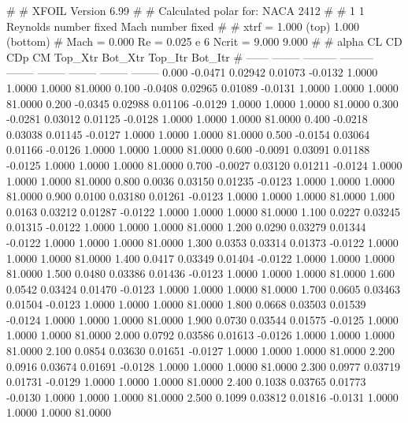 #  
#       XFOIL         Version 6.99
#  
# Calculated polar for: NACA 2412                                       
#  
# 1 1 Reynolds number fixed          Mach number fixed         
#  
# xtrf =   1.000 (top)        1.000 (bottom)  
# Mach =   0.000     Re =     0.025 e 6     Ncrit =   9.000  9.000
#  
#   alpha    CL        CD       CDp       CM     Top_Xtr  Bot_Xtr  Top_Itr  Bot_Itr
#  ------ -------- --------- --------- -------- -------- -------- -------- --------
   0.000  -0.0471   0.02942   0.01073  -0.0132   1.0000   1.0000   1.0000  81.0000
   0.100  -0.0408   0.02965   0.01089  -0.0131   1.0000   1.0000   1.0000  81.0000
   0.200  -0.0345   0.02988   0.01106  -0.0129   1.0000   1.0000   1.0000  81.0000
   0.300  -0.0281   0.03012   0.01125  -0.0128   1.0000   1.0000   1.0000  81.0000
   0.400  -0.0218   0.03038   0.01145  -0.0127   1.0000   1.0000   1.0000  81.0000
   0.500  -0.0154   0.03064   0.01166  -0.0126   1.0000   1.0000   1.0000  81.0000
   0.600  -0.0091   0.03091   0.01188  -0.0125   1.0000   1.0000   1.0000  81.0000
   0.700  -0.0027   0.03120   0.01211  -0.0124   1.0000   1.0000   1.0000  81.0000
   0.800   0.0036   0.03150   0.01235  -0.0123   1.0000   1.0000   1.0000  81.0000
   0.900   0.0100   0.03180   0.01261  -0.0123   1.0000   1.0000   1.0000  81.0000
   1.000   0.0163   0.03212   0.01287  -0.0122   1.0000   1.0000   1.0000  81.0000
   1.100   0.0227   0.03245   0.01315  -0.0122   1.0000   1.0000   1.0000  81.0000
   1.200   0.0290   0.03279   0.01344  -0.0122   1.0000   1.0000   1.0000  81.0000
   1.300   0.0353   0.03314   0.01373  -0.0122   1.0000   1.0000   1.0000  81.0000
   1.400   0.0417   0.03349   0.01404  -0.0122   1.0000   1.0000   1.0000  81.0000
   1.500   0.0480   0.03386   0.01436  -0.0123   1.0000   1.0000   1.0000  81.0000
   1.600   0.0542   0.03424   0.01470  -0.0123   1.0000   1.0000   1.0000  81.0000
   1.700   0.0605   0.03463   0.01504  -0.0123   1.0000   1.0000   1.0000  81.0000
   1.800   0.0668   0.03503   0.01539  -0.0124   1.0000   1.0000   1.0000  81.0000
   1.900   0.0730   0.03544   0.01575  -0.0125   1.0000   1.0000   1.0000  81.0000
   2.000   0.0792   0.03586   0.01613  -0.0126   1.0000   1.0000   1.0000  81.0000
   2.100   0.0854   0.03630   0.01651  -0.0127   1.0000   1.0000   1.0000  81.0000
   2.200   0.0916   0.03674   0.01691  -0.0128   1.0000   1.0000   1.0000  81.0000
   2.300   0.0977   0.03719   0.01731  -0.0129   1.0000   1.0000   1.0000  81.0000
   2.400   0.1038   0.03765   0.01773  -0.0130   1.0000   1.0000   1.0000  81.0000
   2.500   0.1099   0.03812   0.01816  -0.0131   1.0000   1.0000   1.0000  81.0000
